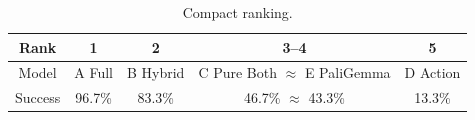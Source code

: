 \documentclass[10pt]{article}
\begin{document}
\begin{table}[h]
\centering
\caption{Compact ranking.}
\label{tab:ranking}
\begin{tabular}{c c c c c}
\toprule
Rank & 1 & 2 & 3--4 & 5 \\
\midrule
Model & A Full & B Hybrid & C Pure Both $\approx$ E PaliGemma & D Action \\
Success & 96.7\% & 83.3\% & 46.7\% $\approx$ 43.3\% & 13.3\% \\
\bottomrule
\end{tabular}
\end{table}
\end{document}
